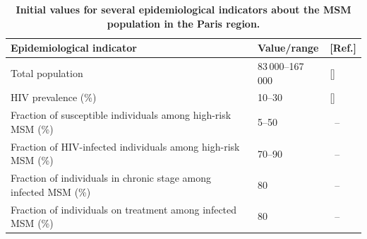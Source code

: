\documentclass[12pt]{article}
\begin{document}
\begin{table}[H]
	\small
	\centering
	\caption[Initial values for several epidemiological indicators about the MSM population in the Paris region]{%
	    {\bf Initial values for several epidemiological indicators about the MSM population in the Paris region.}}
	\begin{tabular}{lll}
	\toprule
	\bf Epidemiological indicator 	& \bf Value/range 	& \bf [Ref.]\\
	\midrule
	Total population										& 83\,000--167\,000 	& [\citenum{Bajos2018,Insee2015}]\\
	HIV prevalence	 (\%)									& 10--30			& [\citenum{Prevagay2017}]\\
	Fraction of susceptible individuals {among high-risk MSM}	(\%) 	& 5--50			& \, --\\
	Fraction of {HIV-}infected individuals {among high-risk MSM} (\%)	& 70--90			& \, --\\
	Fraction of {individuals in chronic stage among infected MSM} (\%)	& 80 				& \, --\\
	Fraction of {individuals on treatment among infected MSM} (\%)			& 80				& \, --\\
	\bottomrule
	\end{tabular}
	\label{tab:InitConds}
\end{table}

\vfill
\phantom{.}
\newpage
\end{document}
